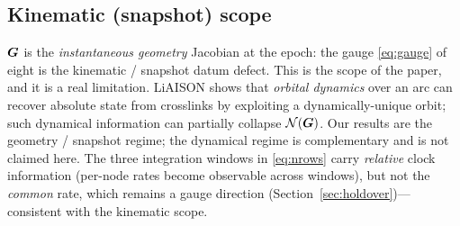 \subsection{Kinematic (snapshot) scope}
\label{sec:scope}

$\bm{G}$ is the \emph{instantaneous geometry} Jacobian at the epoch: the gauge \eqref{eq:gauge}
of eight is the kinematic / snapshot datum defect. This is the scope of the paper, and it is
a real limitation. LiAISON \citep{hillborn2007} shows that \emph{orbital dynamics} over an
arc can recover absolute state from crosslinks by exploiting a dynamically-unique orbit; such
dynamical information can partially collapse $\mathcal{N}(\bm{G})$. Our results are the geometry /
snapshot regime; the dynamical regime is complementary and is not claimed here. The three
integration windows in \eqref{eq:nrows} carry \emph{relative} clock information (per-node
rates become observable across windows), but not the \emph{common} rate, which remains a
gauge direction (Section~\ref{sec:holdover})---consistent with the kinematic scope.
